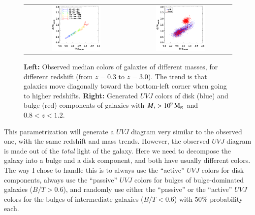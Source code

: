 \documentclass[12pt,a4paper]{article}
\newcommand{\msun}{{\rm M}_\odot}
\newcommand{\mstar}{M_\ast}
\newcommand{\uvj}{$UVJ$\xspace}
\begin{document}
\begin{figure}
\begin{tabular}{cc}
\includegraphics[width=0.5\textwidth]{uvj_track} &
\includegraphics[width=0.5\textwidth]{uvj_gen}
\end{tabular}
\caption{\label{FIG:uvj_track} {\bf Left:} Observed median colors of galaxies of different masses, for different redshift (from $z=0.3$ to $z=3.0$). The trend is that galaxies move diagonally toward the bottom-left corner when going to higher redshifts. {\bf Right:} Generated \uvj colors of disk (blue) and bulge (red) components of galaxies with $\mstar > 10^9\,\msun$ and $0.8 < z < 1.2$.}
\end{figure}

This parametrization will generate a \uvj diagram very similar to the observed one, with the same redshift and mass trends. However, the observed \uvj diagram is made out of the \emph{total} light of the galaxy. Here we need to decompose the galaxy into a bulge and a disk component, and both have usually different colors. The way I chose to handle this is to always use the ``active'' \uvj colors for disk components, always use the ``passive'' \uvj colors for bulges of bulge-dominated galaxies ($B/T>0.6$), and randomly use either the ``passive'' or the ``active'' \uvj colors for the bulges of intermediate galaxies ($B/T<0.6$) with $50\%$ probability each.
\end{document}
